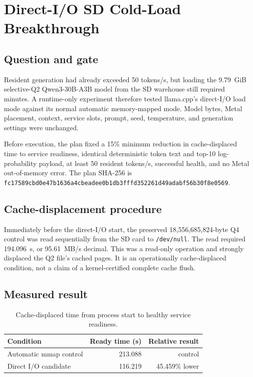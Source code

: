 \section{Direct-I/O SD Cold-Load Breakthrough}
\label{sec:qwen30b-dio-cold-load}

\subsection{Question and gate}

Resident generation had already exceeded 50 tokens/s, but loading the
9.79~GiB selective-Q2 Qwen3-30B-A3B model from the SD warehouse still required
minutes.  A runtime-only experiment therefore tested llama.cpp's direct-I/O
load mode against its normal automatic memory-mapped mode.  Model bytes,
Metal placement, context, service slots, prompt, seed, temperature, and
generation settings were unchanged.

Before execution, the plan fixed a 15\% minimum reduction in cache-displaced
time to service readiness, identical deterministic token text and top-10
log-probability payload, at least 50 resident tokens/s, successful health, and
no Metal out-of-memory error.  The plan SHA-256 is
\texttt{fc17589cbd0e47b1636a4cbeadee0b1db3fffd352261d49adabf56b30f8e0569}.

\subsection{Cache-displacement procedure}

Immediately before the direct-I/O start, the preserved 18,556,685,824-byte Q4
control was read sequentially from the SD card to \texttt{/dev/null}.  The read
required 194.096~s, or 95.61~MB/s decimal.  This was a read-only operation and
strongly displaced the Q2 file's cached pages.  It is an operationally
cache-displaced condition, not a claim of a kernel-certified complete cache
flush.

\subsection{Measured result}

\begin{table}[ht]
\centering
\begin{tabular}{lrr}
\toprule
Condition & Ready time (s) & Relative result \\
\midrule
Automatic mmap control & 213.088 & control \\
Direct I/O candidate & 116.219 & 45.459\% lower \\
\bottomrule
\end{tabular}
\caption{Cache-displaced time from process start to healthy service readiness.}
\end{table}

